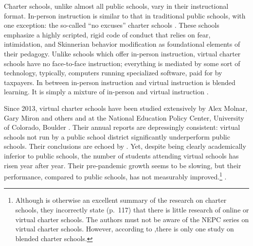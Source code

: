Charter schools, unlike almost all public schools, vary in their instructional format. In-person instruction is similar to that in traditional public schools, with one exception: the so-called ``no excuses'' charter schools \parencite{Horn2016, Torres.Golann2018, Golann2021}. These schools emphasize a highly scripted, rigid code of conduct that relies on fear, intimidation, and Skinnerian behavior modification as foundational elements of their pedagogy.  Unlike schools which offer in-person instruction, virtual charter schools have no face-to-face instruction; everything is mediated by some sort of technology, typically, computers running specialized software, paid for by taxpayers. In between in-person instruction and virtual instruction is blended learning. It is simply a mixture of in-person and virtual instruction \parencite{Horn.Staker2015}.

Since 2013, virtual charter schools have been studied extensively by Alex Molnar, Gary Miron and others and at the National Education Policy Center, University of Colorado, Boulder \parencite{Molnar.etal2013, Molnar.etal2014, Molnar.etal2015, Miron.Gulosino2016, Molnar.etal2017, Miron.etal2018, Molnar.etal2019, Molnar.etal2021,Molnar.etal2023}. Their annual reports are depressingly consistent: virtual schools not run by a public school district significantly underperform public schools. Their conclusions are echoed by \textcite{Woodworth.etal2015, Garcia2018}. Yet, despite being clearly academically inferior to public schools, the number of students attending virtual schools has risen year after year. Their pre-pandemic growth seems to be slowing, but their performance, compared to public schools, has not measurably improved.\footnote{Although  is otherwise an excellent summary of the research on charter schools, they incorrectly state (p.~117) that there is little research of online or virtual charter schools. The authors must not be aware of the NEPC series on virtual charter schools. However, according to \textcite[117]{Molnar.etal2019},there is only one study on blended charter schools.}
\parencite[11]{Molnar.etal2019}.

